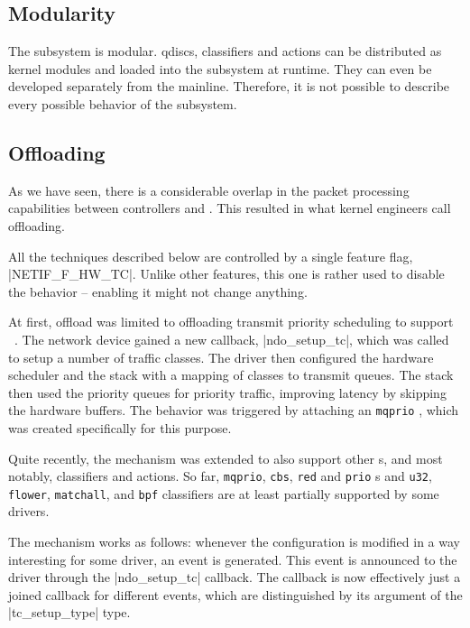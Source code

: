 \subsection{Modularity}

The  subsystem is modular. \Acrshort{qdisc}s, classifiers and actions
can be distributed as kernel modules and loaded into the subsystem at runtime.
They can even be developed separately from the mainline. Therefore, it is not
possible to describe every possible behavior of the subsystem.

\subsection{Offloading}

As we have seen, there is a considerable overlap in the packet processing
capabilities between controllers and . This resulted in what kernel
engineers call  offloading.

All the techniques described below are controlled by a single feature flag,
\macro|NETIF_F_HW_TC|. Unlike other features, this one is rather used to
disable the behavior -- enabling it might not change anything.

At first,  offload was limited to offloading transmit priority scheduling
to support ~\cite{linux-hw-qos}. The network device gained a new
callback, \fnc|ndo_setup_tc|, which was called to setup a number of traffic
classes. The driver then configured the hardware scheduler and the stack with
a mapping of classes to transmit queues. The stack then used the priority
queues for priority traffic, improving latency by skipping the hardware
buffers. The behavior was triggered by attaching an \texttt{mqprio} \qdisc,
which was created specifically for this purpose.

Quite recently, the mechanism was extended to also support other \qdisc{}s, and
most notably, classifiers and actions. So far, \texttt{mqprio}, \texttt{cbs},
\texttt{red} and \texttt{prio} \qdisc{}s and \texttt{u32}, \texttt{flower},
\texttt{matchall}, and \texttt{bpf} classifiers are at least partially
supported by some drivers.

The mechanism works as follows: whenever the  configuration is modified in
a way interesting for some driver, an event is generated. This event is
announced to the driver through the \fnc|ndo_setup_tc| callback. The callback
is now effectively just a joined callback for different events, which are
distinguished by its argument of the \struct|tc_setup_type| type.

